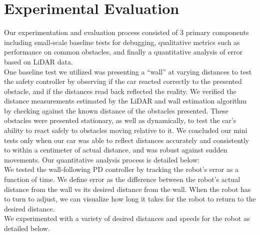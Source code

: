 \documentclass{article}
\begin{document}
\pagebreak
\section{Experimental Evaluation}


Our experimentation and evaluation process consisted of 3 primary components including small-scale baseline tests for debugging, qualitative metrics such as performance on common obstacles, and finally a quantitative analysis of error based on LiDAR data.\\


One baseline test we utilized was presenting a “wall” at varying distances to test the safety controller by observing if the car reacted correctly to the presented obstacle, and if the distances read back reflected the reality. We verified the distance measurements estimated by the LiDAR and wall estimation algorithm by checking against the known distance of the obstacles presented. These obstacles were presented stationary, as well as dynamically, to test the car’s ability to react safely to obstacles moving relative to it. We concluded our mini tests only when our car was able to reflect distances accurately and consistently to within a centimeter of actual distance, and was robust against sudden movements.
Our quantitative analysis process is detailed below:\\

We tested the wall-following PD controller by tracking the robot's error as a function of time. We define error as the difference between the robot’s actual distance from the wall vs its desired distance from the wall. When the robot has to turn to adjust, we can visualize how long it takes for the robot to return to the desired distance. \\

We experimented with a variety of desired distances and speeds for the robot as detailed below. \\
\end{document}
